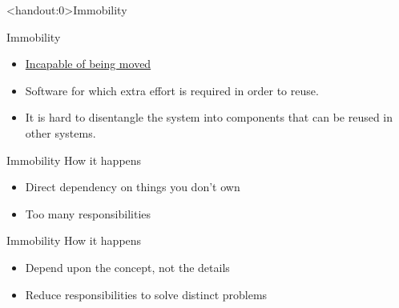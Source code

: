 \documentclass[xcolor=svgnames]{beamer}
\begin{document}

{%
%
\begin{frame}<handout:0>{Immobility}
\end{frame}
}

{%
%
\begin{frame}{Immobility}

    \begin{itemize}
        \pause \item \href{https://www.merriam-webster.com/dictionary/immobile}
            {Incapable of being moved}
        \pause \item Software for which extra effort is required in order to
            reuse.
        \pause \item It is hard to disentangle the system into components that
            can be reused in other systems.
    \end{itemize}
\end{frame}
}


{%
%
\begin{frame}{Immobility}
    How it happens
    \begin{itemize}
        \item<1-> Direct dependency on things you don't own
        \item<2-> Too many responsibilities
    \end{itemize}
\end{frame}
}


{%
%
\begin{frame}{Immobility}
    How it happens
    \begin{itemize}
        \item<1-> Depend upon the concept, not the details
        \item<2-> Reduce responsibilities to solve distinct problems
    \end{itemize}
\end{frame}
}
\end{document}

